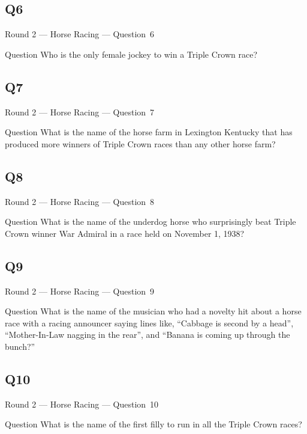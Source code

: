 \documentclass[11pt]{beamer}
\begin{document}
\subsection*{Q6}
\begin{frame}[t]{Round 2 --- Horse Racing --- \mbox{Question 6}}
\vspace{-0.5em}
\begin{block}{Question}
Who is the only female jockey to win a Triple Crown race?
\end{block}
\end{frame}
\subsection*{Q7}
\begin{frame}[t]{Round 2 --- Horse Racing --- \mbox{Question 7}}
\vspace{-0.5em}
\begin{block}{Question}
What is the name of the horse farm in Lexington Kentucky that has produced more winners of Triple Crown races than any other horse farm?
\end{block}
\end{frame}
\subsection*{Q8}
\begin{frame}[t]{Round 2 --- Horse Racing --- \mbox{Question 8}}
\vspace{-0.5em}
\begin{block}{Question}
What is the name of the underdog horse who surprisingly beat Triple Crown winner War Admiral in a race held on November 1, 1938?
\end{block}
\end{frame}
\subsection*{Q9}
\begin{frame}[t]{Round 2 --- Horse Racing --- \mbox{Question 9}}
\vspace{-0.5em}
\begin{block}{Question}
What is the name of the musician who had a novelty hit about a horse race with a racing announcer saying lines like, ``Cabbage is second by a head'', ``Mother-In-Law nagging in the rear'', and ``Banana is coming up through the bunch?''
\end{block}
\end{frame}
\subsection*{Q10}
\begin{frame}[t]{Round 2 --- Horse Racing --- \mbox{Question 10}}
\vspace{-0.5em}
\begin{block}{Question}
What is the name of the first filly to run in all the Triple Crown races?

\end{block}
\end{frame}
\end{document}
